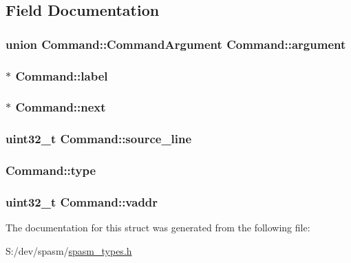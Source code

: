 \subsection{\-Field \-Documentation}
\hypertarget{struct_command_aaccdf5b1e595a63e70012506fd31122c}{
\subsubsection[{argument}]{\setlength{\rightskip}{0pt plus 5cm}union {\bf \-Command\-::\-Command\-Argument}  {\bf \-Command\-::argument}}}
\label{struct_command_aaccdf5b1e595a63e70012506fd31122c}
\hypertarget{struct_command_a928d3057e62c334c92ecc9aa9d90980b}{
\subsubsection[{label}]{$\ast$ {\bf \-Command\-::label}}}
\label{struct_command_a928d3057e62c334c92ecc9aa9d90980b}
\hypertarget{struct_command_af9c9ea6f57adad15eb7af71d6834d0b4}{
\subsubsection[{next}]{$\ast$ {\bf \-Command\-::next}}}
\label{struct_command_af9c9ea6f57adad15eb7af71d6834d0b4}
\hypertarget{struct_command_a3e96525aafdcdfeb775c30f5f334efce}{
\subsubsection[{source\-\_\-line}]{\setlength{\rightskip}{0pt plus 5cm}uint32\-\_\-t {\bf \-Command\-::source\-\_\-line}}}
\label{struct_command_a3e96525aafdcdfeb775c30f5f334efce}
\hypertarget{struct_command_afd23b7e189739dbae6c0f2e93ba02c81}{
\subsubsection[{type}]{ {\bf \-Command\-::type}}}
\label{struct_command_afd23b7e189739dbae6c0f2e93ba02c81}
\hypertarget{struct_command_aa969b498ef234bfdfcc3b98da28e12a3}{
\subsubsection[{vaddr}]{\setlength{\rightskip}{0pt plus 5cm}uint32\-\_\-t {\bf \-Command\-::vaddr}}}
\label{struct_command_aa969b498ef234bfdfcc3b98da28e12a3}


\-The documentation for this struct was generated from the following file\-:\begin{DoxyCompactItemize}
\item 
\-S\-:/dev/spasm/\hyperlink{spasm__types_8h}{spasm\-\_\-types.\-h}\end{DoxyCompactItemize}
